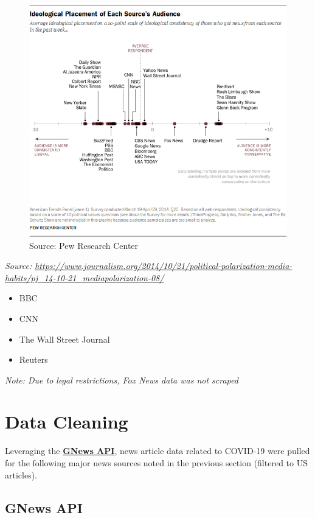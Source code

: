 \documentclass[
]{article}
\begin{document}
\begin{figure}
\centering
\includegraphics{../figures/PJ_14.10.21_mediaPolarization-08.png}
\caption{Source: Pew Research Center}
\end{figure}

\emph{Source:
\url{https://www.journalism.org/2014/10/21/political-polarization-media-habits/pj_14-10-21_mediapolarization-08/}}

\begin{itemize}
\item
  BBC
\item
  CNN
\item
  The Wall Street Journal
\item
  Reuters
\end{itemize}

\emph{Note: Due to legal restrictions, Fox News data was not scraped}

\hypertarget{data-cleaning}{%
\section{Data Cleaning}\label{data-cleaning}}

Leveraging the \textbf{\href{https://gnewsapi.net/}{GNews API}}, news
article data related to COVID-19 were pulled for the following major
news sources noted in the previous section (filtered to US articles).

\hypertarget{gnews-api}{%
\subsection{GNews API}\label{gnews-api}}
\end{document}
